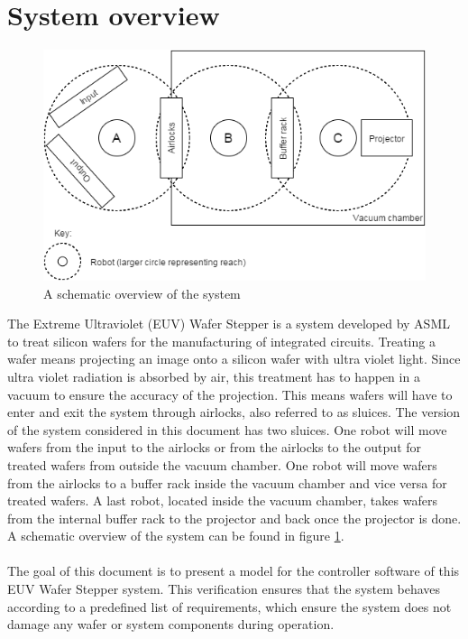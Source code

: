 \documentclass[12pt]{report}
\begin{document}
	\section{System overview}
	\begin{figure}
		\centering
		\includegraphics[scale=0.7]{systemmodel}
		\caption{A schematic overview of the system}
		\label{fig:overview}
	\end{figure}
	The Extreme Ultraviolet (EUV) Wafer Stepper is a system developed by ASML to treat silicon wafers for the manufacturing of integrated circuits. Treating a wafer means projecting an image onto a silicon wafer with ultra violet light. Since ultra violet radiation is absorbed by air, this treatment has to happen in a vacuum to ensure the accuracy of the projection. This means wafers will have to enter and exit the system through airlocks, also referred to as sluices. The version of the system considered in this document has two sluices. One robot will move wafers from the input to the airlocks or from the airlocks to the output for treated wafers from outside the vacuum chamber. One robot will move wafers from the airlocks to a buffer rack inside the vacuum chamber and vice versa for treated wafers. A last robot, located inside the vacuum chamber, takes wafers from the internal buffer rack to the projector and back once the projector is done. A schematic overview of the system can be found in figure \ref{fig:overview}.\\
	\\
	The goal of this document is to present a model for the controller software of this EUV Wafer Stepper system. This verification ensures that the system behaves according to a predefined list of requirements, which ensure the system does not damage any wafer or system components during operation.
\end{document}
